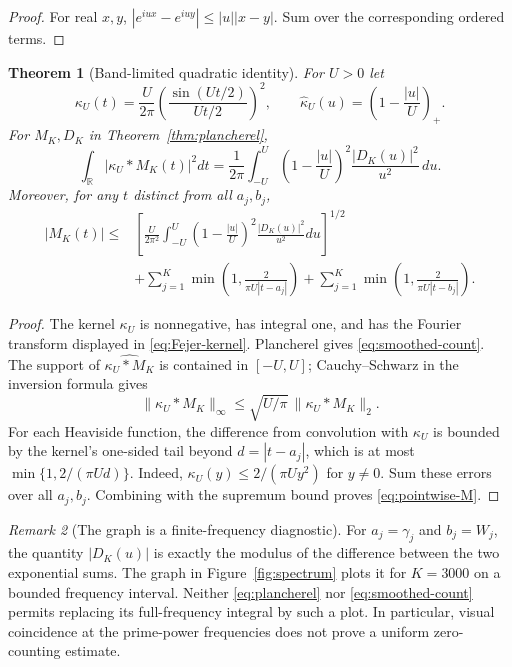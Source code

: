 \documentclass[11pt,leqno]{amsart}
\numberwithin{equation}{section}
\newtheorem{theorem}{Theorem}[section]
\theoremstyle{definition}
\theoremstyle{remark}
\newtheorem{remark}[theorem]{Remark}
\newcommand{\R}{\mathbb R}
\newcommand{\1}{\mathbf 1}
\begin{document}
\begin{proof}
For real $x,y$, $|e^{iux}-e^{iuy}|\le |u||x-y|$. Sum over the corresponding ordered terms.
\end{proof}
\begin{theorem}[Band-limited quadratic identity]\label{thm:band-limited}
For $U>0$ let
\begin{equation}\label{eq:Fejer-kernel}
 \kappa_U(t)=\frac{U}{2\pi}\left(\frac{\sin(Ut/2)}{Ut/2}\right)^2,
 \qquad \widehat\kappa_U(u)=\left(1-\frac{|u|}{U}\right)_+.
\end{equation}
For $M_K,D_K$ in Theorem~\ref{thm:plancherel},
\begin{equation}\label{eq:smoothed-count}
 \boxed{\int_\R|\kappa_U*M_K(t)|^2dt
 =\frac1{2\pi}\int_{-U}^U\left(1-\frac{|u|}{U}\right)^2
 \frac{|D_K(u)|^2}{u^2}\,du.}
\end{equation}
Moreover, for any $t$ distinct from all $a_j,b_j$,
\begin{equation}\label{eq:pointwise-M}
 \begin{aligned}
 |M_K(t)|\le{}&\left[\frac{U}{2\pi^2}\int_{-U}^{U}
 \left(1-\frac{|u|}{U}\right)^2\frac{|D_K(u)|^2}{u^2}du\right]^{1/2}\\
 &+\sum_{j=1}^K\min\left(1,\frac2{\pi U|t-a_j|}\right)
 +\sum_{j=1}^K\min\left(1,\frac2{\pi U|t-b_j|}\right).
 \end{aligned}
\end{equation}
\end{theorem}
\begin{proof}
The kernel $\kappa_U$ is nonnegative, has integral one, and has the Fourier transform displayed in \eqref{eq:Fejer-kernel}. Plancherel gives \eqref{eq:smoothed-count}. The support of $\widehat{\kappa_U*M_K}$ is contained in $[-U,U]$; Cauchy--Schwarz in the inversion formula gives
\[
 \|\kappa_U*M_K\|_\infty\le\sqrt{U/\pi}\,\|\kappa_U*M_K\|_2.
\]
For each Heaviside function, the difference from convolution with $\kappa_U$ is bounded by the kernel's one-sided tail beyond $d=|t-a_j|$, which is at most $\min\{1,2/(\pi Ud)\}$. Indeed, $\kappa_U(y)\le 2/(\pi U y^2)$ for $y\ne0$. Sum these errors over all $a_j,b_j$. Combining with the supremum bound proves \eqref{eq:pointwise-M}.
\end{proof}
\begin{remark}[The graph is a finite-frequency diagnostic]
For $a_j=\gamma_j$ and $b_j=W_j$, the quantity $|D_K(u)|$ is exactly the modulus of the difference between the two exponential sums. The graph in Figure~\ref{fig:spectrum} plots it for $K=3000$ on a bounded frequency interval. Neither \eqref{eq:plancherel} nor \eqref{eq:smoothed-count} permits replacing its full-frequency integral by such a plot. In particular, visual coincidence at the prime-power frequencies does not prove a uniform zero-counting estimate.
\end{remark}
\end{document}
